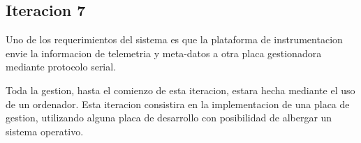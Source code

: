 \subsection{Iteracion 7} %
\label{sub:iteracion_7}

Uno de los requerimientos del sistema es que la plataforma de instrumentacion envie la informacion de telemetria y meta-datos a otra placa gestionadora mediante protocolo serial. 

Toda la gestion, hasta el comienzo de esta iteracion, estara hecha mediante el uso de un ordenador. Esta iteracion consistira en la implementacion de una placa de gestion, utilizando alguna placa de desarrollo con posibilidad de albergar un sistema operativo.











